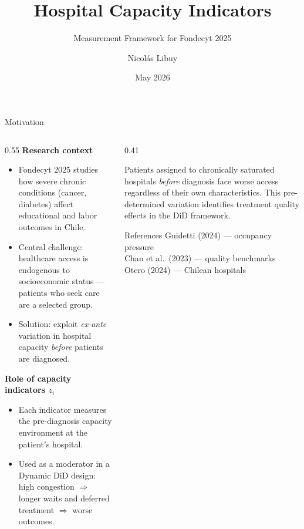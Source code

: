 \documentclass[aspectratio=169]{beamer}
\title{Hospital Capacity Indicators}
\subtitle{Measurement Framework for Fondecyt 2025}
\author{Nicol\'as Libuy}
\institute{Universidad Adolfo Ib\'a\~nez}
\date{May 2026}
\begin{document}

\begin{frame}
  \titlepage
\end{frame}

\begin{frame}{Motivation}
  \begin{columns}[T]
    \begin{column}{0.55\textwidth}
      \textbf{Research context}
      \begin{itemize}\scriptsize\setlength{\itemsep}{2pt}
        \item Fondecyt 2025 studies how severe chronic conditions (cancer, diabetes)
              affect educational and labor outcomes in Chile.
        \item Central challenge: healthcare access is endogenous to socioeconomic status
              --- patients who seek care are a selected group.
        \item Solution: exploit \emph{ex-ante} variation in hospital capacity
              \emph{before} patients are diagnosed.
      \end{itemize}
      \smallskip
      \textbf{Role of capacity indicators $z_i$}
      \begin{itemize}\scriptsize\setlength{\itemsep}{2pt}
        \item Each indicator measures the pre-diagnosis capacity environment at the
              patient's hospital.
        \item Used as a moderator in a Dynamic DiD design: high congestion $\Rightarrow$
              longer waits and deferred treatment $\Rightarrow$ worse outcomes.
      \end{itemize}
    \end{column}
    \begin{column}{0.41\textwidth}
      \begin{keybox}
        \scriptsize
         Patients assigned to chronically saturated hospitals
        \emph{before} diagnosis face worse access regardless of their own
        characteristics. This pre-determined variation identifies treatment
        quality effects in the DiD framework.
      \end{keybox}
      \smallskip
      \begin{block}{References}
        \scriptsize
        Guidetti (2024) --- occupancy pressure \\
        Chan et al.\ (2023) --- quality benchmarks \\
        Otero (2024) --- Chilean hospitals
      \end{block}
    \end{column}
  \end{columns}
\end{frame}
\end{document}
